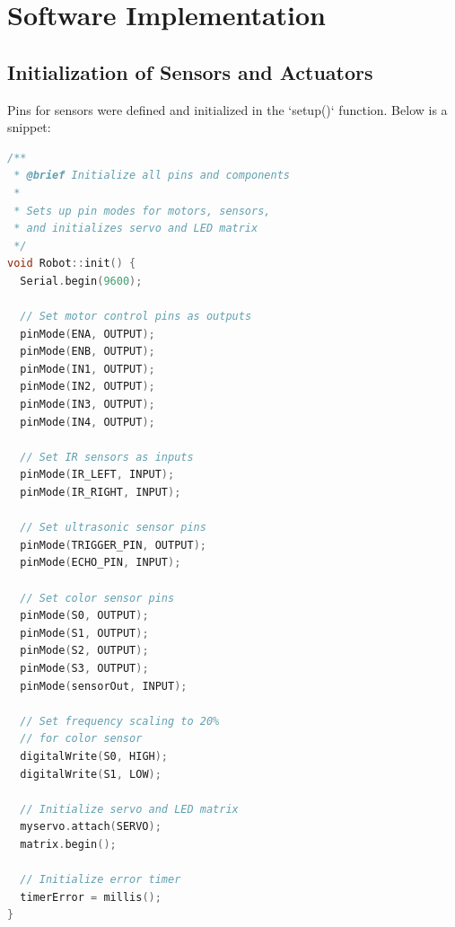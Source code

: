 \documentclass[conference]{IEEEtran}
\begin{document}


    \section{Software Implementation}
    \label{sec:soft}

    \subsection{Initialization of Sensors and Actuators}\label{subsec:initialization-of-sensors-and-actuators}
    Pins for sensors were defined and initialized in the `setup()` function. Below is a snippet:
    \begin{lstlisting}[language=C++, caption=Sensor Initialization Code,label={lst:lstlisting}]
/**
 * @brief Initialize all pins and components
 *
 * Sets up pin modes for motors, sensors,
 * and initializes servo and LED matrix
 */
void Robot::init() {
  Serial.begin(9600);

  // Set motor control pins as outputs
  pinMode(ENA, OUTPUT);
  pinMode(ENB, OUTPUT);
  pinMode(IN1, OUTPUT);
  pinMode(IN2, OUTPUT);
  pinMode(IN3, OUTPUT);
  pinMode(IN4, OUTPUT);

  // Set IR sensors as inputs
  pinMode(IR_LEFT, INPUT);
  pinMode(IR_RIGHT, INPUT);

  // Set ultrasonic sensor pins
  pinMode(TRIGGER_PIN, OUTPUT);
  pinMode(ECHO_PIN, INPUT);

  // Set color sensor pins
  pinMode(S0, OUTPUT);
  pinMode(S1, OUTPUT);
  pinMode(S2, OUTPUT);
  pinMode(S3, OUTPUT);
  pinMode(sensorOut, INPUT);

  // Set frequency scaling to 20%
  // for color sensor
  digitalWrite(S0, HIGH);
  digitalWrite(S1, LOW);

  // Initialize servo and LED matrix
  myservo.attach(SERVO);
  matrix.begin();

  // Initialize error timer
  timerError = millis();
}
    \end{lstlisting}
\end{document}
